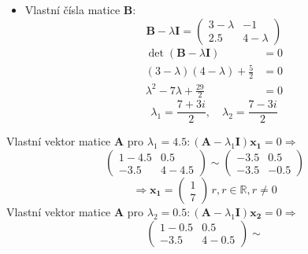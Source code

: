 \begin{mahtexam}
  \begin{itemize}
    \item Vlastní čísla matice \textbf{B}:
      \begin{equation*}
          \textbf{B} - \lambda\textbf{I}=
            \begin{pmatrix}
              3-\lambda  & -1             \\
              2.5        &  4-\lambda
            \end{pmatrix}
      \end{equation*}
      \begin{align*}
        \det(\mathbf{B}-\lambda\mathbf{I}) &= 0 \\
        (3-\lambda)(4-\lambda)+\frac{5}{2} &= 0 \\
        \lambda^2-7\lambda+\frac{29}{2}    &= 0
      \end{align*}
      \begin{equation*}
        \lambda_1 = \frac{7+3i}{2},\quad \lambda_2 = \frac{7-3i}{2}
      \end{equation*}
  \end{itemize}
  Vlastní vektor matice \(\mathbf{A}\) pro \(\lambda_1=4.5: (\mathbf{A} -
  \lambda_1\mathbf{I})\mathbf{x_1} = 0 \Rightarrow\)
  \begin{equation*}
    \begin{pmatrix}
      1  -4.5  &  0.5     \\
      -3.5     &  4-4.5
    \end{pmatrix}
    \sim
    \begin{pmatrix}
      -3.5  &  0.5         \\
      -3.5  & -0.5
    \end{pmatrix}
  \end{equation*}
  \begin{equation*}
    \Rightarrow\mathbf{x_1} =
    \begin{pmatrix}
      1 \\ 7
    \end{pmatrix}
    \, r, r\in\mathbb{R}, r\neq0
  \end{equation*}
  Vlastní vektor matice \(\mathbf{A}\) pro \(\lambda_2=0.5: (\mathbf{A} -
  \lambda_1\mathbf{I})\mathbf{x_2}=0 \Rightarrow\)
  \begin{equation*}
    \begin{pmatrix}
      1  -0.5  &  0.5   \\
      -3.5      &  4-0.5
    \end{pmatrix}
    \sim

\end{equation*}
\end{mahtexam}
